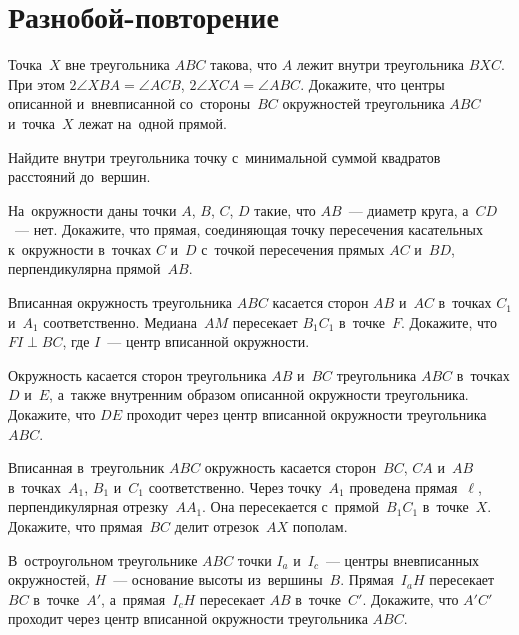 
\section*{Разнобой-повторение}


\begin{problems}

\item
Точка~$X$ вне треугольника $ABC$ такова, что $A$ лежит внутри
треугольника $BXC$.
При этом $2 \angle XBA = \angle ACB$, $2 \angle XCA = \angle ABC$.
Докажите, что центры описанной и~вневписанной со~стороны~$BC$ окружностей
треугольника $ABC$ и~точка~$X$ лежат на~одной прямой.

\item
Найдите внутри треугольника точку с~минимальной суммой квадратов расстояний
до~вершин.

\item
На~окружности даны точки $A$, $B$, $C$, $D$ такие, что $AB$~--- диаметр круга,
а~$CD$~--- нет.
Докажите, что прямая, соединяющая точку пересечения касательных к~окружности
в~точках $C$ и~$D$ с~точкой пересечения прямых $AC$ и~$BD$, перпендикулярна
прямой~$AB$.

\item
Вписанная окружность треугольника $ABC$ касается сторон $AB$ и~$AC$
в~точках $C_1$ и~$A_1$ соответственно.
Медиана~$AM$ пересекает $B_1 C_1$ в~точке~$F$.
Докажите, что $FI \perp BC$, где $I$~--- центр вписанной окружности.

\item
Окружность касается сторон треугольника $AB$ и~$BC$ треугольника $ABC$
в~точках $D$ и~$E$, а~также внутренним образом описанной окружности
треугольника.
Докажите, что $DE$ проходит через центр вписанной окружности
треугольника $ABC$.

\item
Вписанная в~треугольник $ABC$ окружность касается сторон~$BC$, $CA$ и~$AB$
в~точках~$A_1$, $B_1$ и~$C_1$ соответственно.
Через точку~$A_1$ проведена прямая~$\ell$, перпендикулярная отрезку~$A A_1$.
Она пересекается с~прямой~$B_1 C_1$ в~точке~$X$.
Докажите, что прямая~$BC$ делит отрезок~$AX$ пополам.

\item
В~остроугольном треугольнике $ABC$ точки $I_{a}$ и~$I_{c}$~--- центры
вневписанных окружностей, $H$~--- основание высоты из~вершины~$B$.
Прямая~$I_{a} H$ пересекает $BC$ в~точке~$A'$, а~прямая~$I_{c} H$ пересекает
$AB$ в~точке~$C'$.
Докажите, что $A'C'$ проходит через центр вписанной окружности
треугольника $ABC$.


\end{problems}
